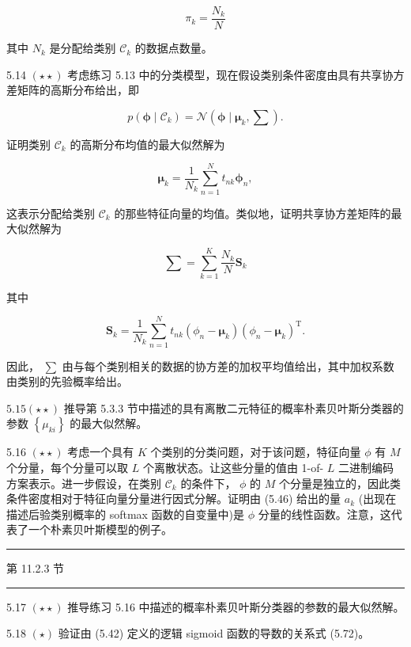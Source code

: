 \documentclass[10pt]{article}
\newcommand{\HRule}{\begin{center}\rule{0.9\linewidth}{0.2mm}\end{center}}
\begin{document}
\[
{\pi }_{k} = \frac{{N}_{k}}{N} \tag{5.101}
\]

其中 \({N}_{k}\) 是分配给类别 \({\mathcal{C}}_{k}\) 的数据点数量。

5.14 \(\left( {\star  \star  }\right)\) 考虑练习 5.13 中的分类模型，现在假设类别条件密度由具有共享协方差矩阵的高斯分布给出，即

\[
p\left( {\mathbf{\phi } \mid  {\mathcal{C}}_{k}}\right)  = \mathcal{N}\left( {\mathbf{\phi } \mid  {\mathbf{\mu }}_{k},\mathbf{\sum }}\right) . \tag{5.102}
\]

证明类别 \({\mathcal{C}}_{k}\) 的高斯分布均值的最大似然解为

\[
{\mathbf{\mu }}_{k} = \frac{1}{{N}_{k}}\mathop{\sum }\limits_{{n = 1}}^{N}{t}_{nk}{\mathbf{\phi }}_{n}, \tag{5.103}
\]

这表示分配给类别 \({\mathcal{C}}_{k}\) 的那些特征向量的均值。类似地，证明共享协方差矩阵的最大似然解为

\[
\mathbf{\sum } = \mathop{\sum }\limits_{{k = 1}}^{K}\frac{{N}_{k}}{N}{\mathbf{S}}_{k} \tag{5.104}
\]

其中

\[
{\mathbf{S}}_{k} = \frac{1}{{N}_{k}}\mathop{\sum }\limits_{{n = 1}}^{N}{t}_{nk}\left( {{\phi }_{n} - {\mathbf{\mu }}_{k}}\right) {\left( {\phi }_{n} - {\mathbf{\mu }}_{k}\right) }^{\mathrm{T}}. \tag{5.105}
\]

因此， \(\mathbf{\sum }\) 由与每个类别相关的数据的协方差的加权平均值给出，其中加权系数由类别的先验概率给出。

\({5.15}\left( {\star  \star  }\right)\) 推导第 5.3.3 节中描述的具有离散二元特征的概率朴素贝叶斯分类器的参数 \(\left\{  {\mu }_{ki}\right\}\) 的最大似然解。

5.16 \(\left( {\star  \star  }\right)\) 考虑一个具有 \(K\) 个类别的分类问题，对于该问题，特征向量 \(\phi\) 有 \(M\) 个分量，每个分量可以取 \(L\) 个离散状态。让这些分量的值由 1-of- \(L\) 二进制编码方案表示。进一步假设，在类别 \({\mathcal{C}}_{k}\) 的条件下， \(\phi\) 的 \(M\) 个分量是独立的，因此类条件密度相对于特征向量分量进行因式分解。证明由 (5.46) 给出的量 \({a}_{k}\) (出现在描述后验类别概率的 softmax 函数的自变量中)是 \(\phi\) 分量的线性函数。注意，这代表了一个朴素贝叶斯模型的例子。

\HRule

第 11.2.3 节

\HRule

5.17 \(\left( {\star  \star  }\right)\) 推导练习 5.16 中描述的概率朴素贝叶斯分类器的参数的最大似然解。

5.18 \(\left( \star \right)\) 验证由 (5.42) 定义的逻辑 sigmoid 函数的导数的关系式 (5.72)。
\end{document}
